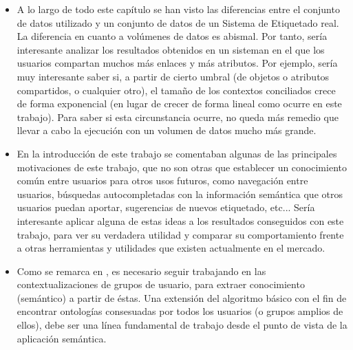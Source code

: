 \begin{itemize}

	\item A lo largo de todo este capítulo se han visto las diferencias entre el conjunto de datos utilizado y un conjunto de datos de un Sistema de Etiquetado real. La diferencia en cuanto a volúmenes de datos es abismal. Por tanto, sería interesante analizar los resultados obtenidos en un sisteman en el que los usuarios compartan muchos más enlaces y más atributos. Por ejemplo, sería muy interesante saber si, a partir de cierto umbral (de objetos o atributos compartidos, o cualquier otro), el tamaño de los contextos conciliados crece de forma exponencial (en lugar de crecer de forma lineal como ocurre en este trabajo). Para saber si esta circunstancia ocurre, no queda más remedio que llevar a cabo la ejecución con un volumen de datos mucho más grande.

	\item En la introducción de este trabajo se comentaban algunas de las principales motivaciones de este trabajo, que no son otras que establecer un conocimiento común entre usuarios para otros usos futuros, como navegación entre usuarios, búsquedas autocompletadas con la información semántica que otros usuarios puedan aportar, sugerencias de nuevos etiquetado, etc... Sería interesante aplicar alguna de estas ideas a los resultados conseguidos con este trabajo, para ver su verdadera utilidad y comparar su comportamiento frente a otras herramientas y utilidades que existen actualmente en el mercado.

	\item Como se remarca en \cite{algoritmo}, es necesario seguir trabajando en las contextualizaciones de grupos de usuario, para extraer conocimiento (semántico) a partir de éstas. Una extensión del algoritmo básico con el fin de encontrar ontologías consesuadas por todos los usuarios (o grupos amplios de ellos), debe ser una línea fundamental de trabajo desde el punto de vista de la aplicación semántica.

\end{itemize}






